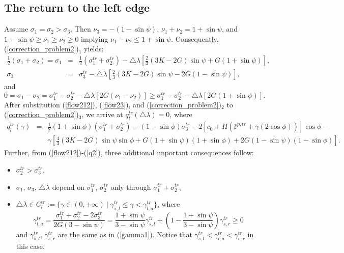 \documentclass[a4paper,12pt]{article}
\theoremstyle{remark}
\numberwithin{equation}{section}
\begin{document}
\subsection{The return to the left edge} 

Assume $\sigma_1=\sigma_2>\sigma_3$. Then $\nu_3=-(1-\sin\psi)$, $\nu_1+\nu_2=1+\sin\psi$, and $1+\sin\psi\geq \nu_1\geq \nu_2\geq0$ implying $\nu_1-\nu_2\leq1+\sin\psi$.  Consequently, (\ref{correction_problem2})$_1$ yields:
\begin{eqnarray}
\frac{1}{2}(\sigma_1+\sigma_2)=\sigma_1&=&\frac{1}{2}(\sigma_1^{tr}+\sigma_2^{tr})-\triangle\lambda\left[\frac{2}{3}(3K-2G)\sin\psi+G(1+\sin\psi)\right],\label{flow212}\\
\sigma_3&=&\sigma_3^{tr}-\triangle\lambda\left[\frac{2}{3}(3K-2G)\sin\psi-2G(1-\sin\psi)\right],\label{flow23}
\end{eqnarray}
and
\begin{equation}
0=\sigma_1-\sigma_2=\sigma_1^{tr}-\sigma_2^{tr}-\triangle\lambda[2G(\nu_1-\nu_2)]\geq\sigma_1^{tr}-\sigma_2^{tr}-\triangle\lambda[2G(1+\sin\psi)].
\label{est_left}
\end{equation}
After substitution (\ref{flow212}), (\ref{flow23}), and (\ref{correction_problem2})$_2$ to (\ref{correction_problem2})$_3$, we arrive at $q_l^{tr}(\triangle\lambda)=0$, where 
\begin{eqnarray}
q^{tr}_l(\gamma)&=&\frac{1}{2}(1+\sin\phi)(\sigma_1^{tr}+\sigma_2^{tr})-(1-\sin\phi)\sigma_3^{tr}-2\left[c_0+H\left(\bar{\varepsilon}^{p,tr}+\gamma (2\cos\phi)\right)\right]\cos\phi-\nonumber\\
&&\gamma\left[\frac{4}{3}(3K-2G)\sin\psi\sin\phi+ G(1+\sin\psi)(1+\sin\phi)+ 2G(1-\sin\psi)(1-\sin\phi)\right].\qquad
\label{q2}
\end{eqnarray}
Further, from (\ref{flow212})-(\ref{q2}), three additional important consequences follow:
\begin{itemize}
\item $\sigma_2^{tr}>\sigma_3^{tr}$,
\item $\sigma_1$, $\sigma_3$, $\triangle\lambda$ depend on $\sigma^{tr}_1$, $\sigma^{tr}_2$ only through $\sigma^{tr}_1+\sigma^{tr}_2$,
\item $\triangle\lambda\in C^{tr}_l:=\{\gamma\in(0,+\infty)\ |\; \gamma^{tr}_{s,l}\leq\gamma<\gamma^{tr}_{l,a}\}$, where
\begin{equation}
\gamma^{tr}_{l,a}=\frac{\sigma_1^{tr}+\sigma_2^{tr}-2\sigma_3^{tr}}{2G(3-\sin\psi)}=\frac{1+\sin\psi}{3-\sin\psi}\gamma^{tr}_{s,l}+\left(1-\frac{1+\sin\psi}{3-\sin\psi}\right)\gamma^{tr}_{s,r}\geq0
\label{gamma2}
\end{equation}
and $\gamma^{tr}_{s,l}$, $\gamma^{tr}_{s,r}$ are the same as in (\ref{gamma1}). Notice that $\gamma^{tr}_{s,l}<\gamma^{tr}_{l,a}<\gamma^{tr}_{s,r}$ in this case.
\end{itemize}
\end{document}
